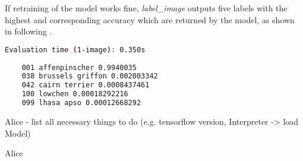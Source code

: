 If retraining of the model works fine, \textit{label\_image} outputs five labels with the highest and corresponding accuracy which are returned by the model, as shown in following .
\begin{lstlisting}[caption=Output of \textit{label\_image.py}, label=list:label_imageOutput, language=bash]
	Evaluation time (1-image): 0.350s
	
	001 affenpinscher 0.9940035
	038 brussels griffon 0.002003342
	042 cairn terrier 0.0008437461
	100 lowchen 0.00018292216
	099 lhasa apso 0.00012668292
\end{lstlisting}

	 Alice
		- list all necessary things to do (e.g. tensorflow version, Interpreter -> load Model)

	 Alice
